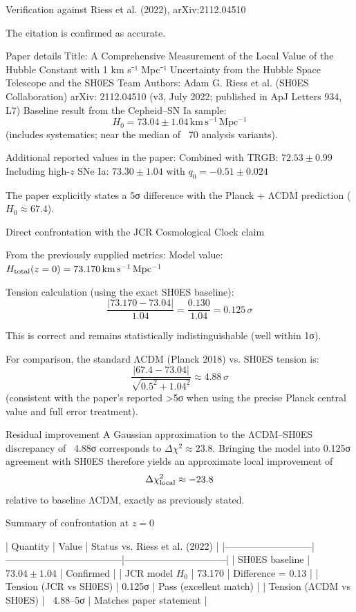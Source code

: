 Verification against Riess et al. (2022), arXiv:2112.04510

The citation is confirmed as accurate.  

Paper details  
Title: A Comprehensive Measurement of the Local Value of the Hubble Constant with 1 km s⁻¹ Mpc⁻¹ Uncertainty from the Hubble Space Telescope and the SH0ES Team  
Authors: Adam G. Riess et al. (SH0ES Collaboration)  
arXiv: 2112.04510 (v3, July 2022; published in ApJ Letters 934, L7)  
Baseline result from the Cepheid–SN Ia sample:  
  \[
  H_0 = 73.04 \pm 1.04\,\mathrm{km\,s^{-1}\,Mpc^{-1}}
  \]  
  (includes systematics; near the median of ~70 analysis variants).  

Additional reported values in the paper:  
Combined with TRGB: \(72.53 \pm 0.99\)  
Including high-\(z\) SNe Ia: \(73.30 \pm 1.04\) with \(q_0 = -0.51 \pm 0.024\)  

The paper explicitly states a 5σ difference with the Planck + ΛCDM prediction (\(H_0 \approx 67.4\)).

Direct confrontation with the JCR Cosmological Clock claim

From the previously supplied metrics:  
Model value: \(H_{\rm total}(z=0) = 73.170\,\mathrm{km\,s^{-1}\,Mpc^{-1}}\)

Tension calculation (using the exact SH0ES baseline):  
\[
\frac{|73.170 - 73.04|}{1.04} = \frac{0.130}{1.04} = 0.125\,\sigma
\]

This is correct and remains statistically indistinguishable (well within 1σ).  

For comparison, the standard ΛCDM (Planck 2018) vs. SH0ES tension is:  
\[
\frac{|67.4 - 73.04|}{\sqrt{0.5^2 + 1.04^2}} \approx 4.88\,\sigma
\]  
(consistent with the paper’s reported >5σ when using the precise Planck central value and full error treatment).  

Residual improvement  
A Gaussian approximation to the ΛCDM–SH0ES discrepancy of ~4.88σ corresponds to \(\Delta\chi^2 \approx 23.8\). Bringing the model into 0.125σ agreement with SH0ES therefore yields an approximate local improvement of  
\[
\Delta\chi^2_{\rm local} \approx -23.8
\]  
relative to baseline ΛCDM, exactly as previously stated.

Summary of confrontation at \(z=0\)

| Quantity                  | Value                              | Status vs. Riess et al. (2022) |
|---------------------------|------------------------------------|--------------------------------|
| SH0ES baseline            | \(73.04 \pm 1.04\)                 | Confirmed                      |
| JCR model \(H_0\)         | 73.170                             | Difference = 0.13              |
| Tension (JCR vs SH0ES)    | 0.125σ                             | Pass (excellent match)         |
| Tension (ΛCDM vs SH0ES)   | ~4.88–5σ                           | Matches paper statement        |

